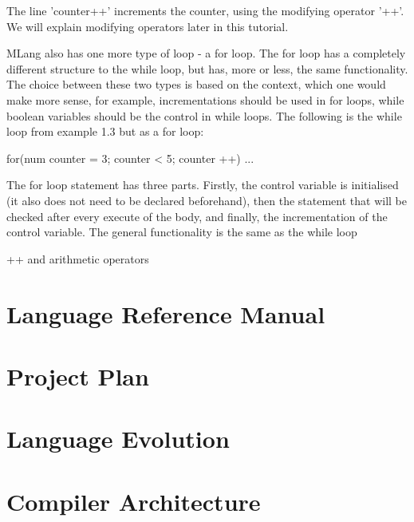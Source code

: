 \documentclass{l3proj}
\begin{document}
The line 'counter++' increments the counter, using the modifying operator '++'. We will explain modifying operators later in this tutorial.

MLang also has one more type of loop - a for loop. The for loop has a completely different structure to the while loop, but has, more or less, the same functionality. The choice between these two types is based on the context, which one would make more sense, for example, incrementations should be used in for loops, while boolean variables should be the control in while loops. The following is the while loop from example 1.3 but as a for loop:
\begin{lstListing}
for(num counter = 3; counter < 5; counter ++){
...
}
\end{lstListing}
The for loop statement has three parts. Firstly, the control variable is initialised (it also does not need to be declared beforehand), then the statement that will be checked after every execute of the body, and finally, the incrementation of the control variable. The general functionality is the same as the while loop




++ and arithmetic operators



\chapter{Language Reference Manual}
\label{manual}

\chapter{Project Plan}
\label{plan}

\chapter{Language Evolution}
\label{evo}

\chapter{Compiler Architecture}
\label{arch}
\end{document}

